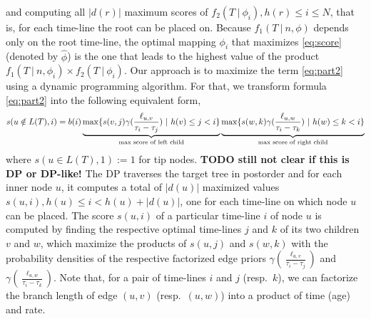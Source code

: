 \documentclass{llncs}
\begin{document}
%
%
and computing all $|d(r)|$ maximum scores of 
$f_2(T\ |\ \phi_i), h(r) \leq i \leq N$, that is, for each time-line the root can be placed on. 
Because $f_1(T\ |\ n,\phi)$ depends only on the root time-line, the optimal mapping $\phi_i$ that
maximizes \ref{eq:score} (denoted by $\hat\phi$) is the one that leads to the
highest value of the product $f_1(T\ |\ n,\phi_i)\times f_2(T\ |\ \phi_i)$.%
Our approach is to maximize the term \ref{eq:part2} using a dynamic programming
algorithm. For that, we transform formula \ref{eq:part2} into
the following equivalent form, 
%
%
\begin{equation}\label{eq:DP}
\begin{split}
s(u\notin L(T),i) = %
                    b(i)
                    \underbrace{
                        \max\{ s(v,j)\gamma(\frac{\ell_{u,v}}{\tau_i - \tau_j})\ |\ 
                          h(v) \leq j < i\}
                      }_{\textrm{max score of left child}}
                    \underbrace{
                        \max\{ s(w,k)\gamma(\frac{\ell_{u,w}}{\tau_i - \tau_k\vphantom{\tau_j}})\ |\ 
                          h(w) \leq k < i\}
                      }_{\textrm{max score of right child}}\\
\end{split}
\end{equation}
%
%
where $s(u\in L(T),1) := 1$ for tip nodes.
{\bf TODO still not clear if this is DP or DP-like!}
The DP traverses the target tree in postorder and for each inner node $u$, it
computes a total of $|d(u)|$ maximized values $s(u,i), h(u) \leq i < h(u) + |d(u)|$, one
for each time-line on which node $u$ can be placed.  The score $s(u,i)$ of a
particular time-line $i$ of node $u$ is computed by finding the respective 
optimal time-lines $j$ and $k$ of its two children $v$ and $w$, which maximize the products of
$s(u,j)$ and $s(w,k)$ with the probability densities of the respective factorized edge
priors  $\gamma(\frac{\ell_{u,v}}{\tau_{i}-\tau_{j}})$ and
$\gamma(\frac{\ell_{u,w}}{\tau_{i}-\tau_{k}})$.
                    Note that, for a pair of time-lines $i$
and $j$ (resp.~$k$), we can factorize the branch length of edge $(u,v)$ 
(resp.~$(u,w)$) into a product of time (age) and rate.
\end{document}
